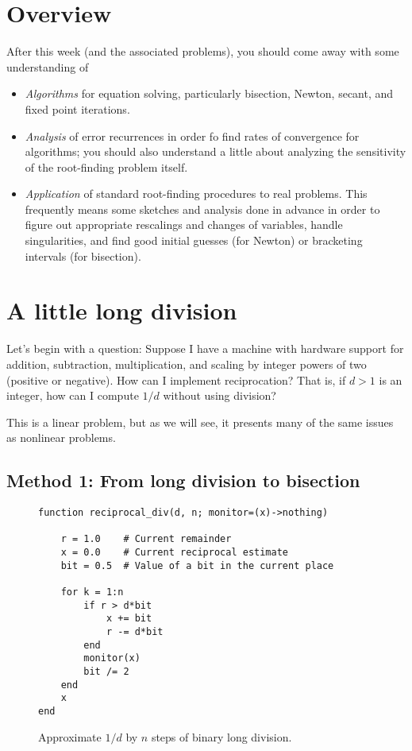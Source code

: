 \documentclass[12pt, leqno]{article} %
\begin{document}

\section{Overview}

After this week (and the associated problems), you should come away
with some understanding of
\begin{itemize}
\item {\em Algorithms} for equation solving, particularly bisection,
  Newton, secant, and fixed point iterations.
\item {\em Analysis} of error recurrences in order fo find rates of
  convergence for algorithms; you should also understand a little
  about analyzing the sensitivity of the root-finding problem itself.
\item {\em Application} of standard root-finding procedures to real
  problems.  This frequently means some sketches and analysis done in
  advance in order to figure out appropriate rescalings and changes of
  variables, handle singularities, and find good initial guesses (for
  Newton) or bracketing intervals (for bisection).
\end{itemize}


\section{A little long division}

Let's begin with a question: Suppose I have a machine with hardware
support for addition, subtraction, multiplication, and scaling by
integer powers of two (positive or negative).  How can I implement
reciprocation?  That is, if $d > 1$ is an integer, how can I compute
$1/d$ without using division?

This is a linear problem, but as we will see, it presents many of
the same issues as nonlinear problems.

\subsection{Method 1: From long division to bisection}

\begin{figure}
\begin{lstlisting}
function reciprocal_div(d, n; monitor=(x)->nothing)

	r = 1.0    # Current remainder
	x = 0.0    # Current reciprocal estimate
	bit = 0.5  # Value of a bit in the current place

	for k = 1:n
		if r > d*bit
			x += bit
			r -= d*bit
		end
		monitor(x)
		bit /= 2
	end
	x
end
\end{lstlisting}
\caption{Approximate $1/d$ by $n$ steps of binary long division.}
\label{fig-division}
\end{figure}
\end{document}
